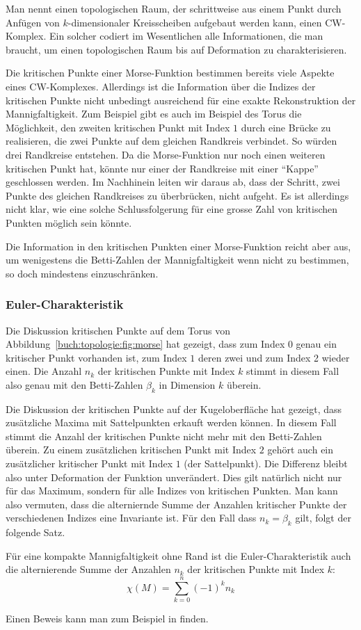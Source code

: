 Man nennt einen topologischen Raum, der schrittweise aus einem Punkt
durch Anfügen von $k$-dimensionaler Kreisscheiben aufgebaut werden kann,
einen CW-Komplex.
%
Ein solcher codiert im Wesentlichen alle Informationen, die man braucht,
um einen topologischen Raum bis auf Deformation zu charakterisieren.

Die kritischen Punkte einer Morse-Funktion bestimmen bereits viele
Aspekte eines CW-Komplexes.
Allerdings ist die Information über die Indizes der kritischen Punkte
nicht unbedingt ausreichend für eine exakte Rekonstruktion der
Mannigfaltigkeit.
Zum Beispiel gibt es auch im Beispiel des Torus die Möglichkeit,
den zweiten kritischen Punkt mit Index $1$ durch eine Brücke zu
realisieren, die zwei Punkte auf dem gleichen Randkreis verbindet.
So würden drei Randkreise entstehen.
Da die Morse-Funktion nur noch einen weiteren kritischen Punkt hat,
könnte nur einer der Randkreise mit einer ``Kappe'' geschlossen
werden.
Im Nachhinein leiten wir daraus ab, dass der Schritt, zwei Punkte des
gleichen Randkreises zu überbrücken, nicht aufgeht.
Es ist allerdings nicht klar, wie eine solche Schlussfolgerung
für eine grosse Zahl von kritischen Punkten möglich sein könnte.

Die Information in den kritischen Punkten einer Morse-Funktion reicht
aber aus, um wenigestens die Betti-Zahlen der Mannigfaltigkeit
wenn nicht zu bestimmen, so doch mindestens einzuschränken.

%
%
\subsubsection{Euler-Charakteristik}
Die Diskussion kritischen Punkte auf dem Torus von
Abbildung~\ref{buch:topologie:fig:morse} hat gezeigt,
dass zum Index $0$ genau ein kritischer Punkt vorhanden ist,
zum Index $1$ deren zwei und zum Index 2 wieder einen.
Die Anzahl $n_k$ der kritischen Punkte mit Index $k$ stimmt in diesem Fall
also genau mit den Betti-Zahlen $\beta_k$ in Dimension $k$ überein.

Die Diskussion der kritischen Punkte auf der Kugeloberfläche
hat gezeigt, dass zusätzliche Maxima mit Sattelpunkten erkauft werden
können.
In diesem Fall stimmt die Anzahl der kritischen Punkte nicht mehr
mit den Betti-Zahlen überein.
Zu einem zusätzlichen kritischen Punkt mit Index $2$ gehört auch
ein zusätzlicher kritischer Punkt mit Index $1$ (der Sattelpunkt).
Die Differenz bleibt also unter Deformation der Funktion unverändert.
Dies gilt natürlich nicht nur für das Maximum, sondern für alle Indizes
von kritischen Punkten.
Man kann also vermuten, dass die alterniernde Summe der Anzahlen
kritischer Punkte der verschiedenen Indizes eine Invariante ist.
Für den Fall dass $n_k=\beta_k$ gilt, folgt der folgende Satz.

\begin{satz}
Für eine kompakte Mannigfaltigkeit ohne Rand ist die Euler-Charakteristik
auch die alternierende Summe der Anzahlen $n_k$ der kritischen Punkte 
mit Index $k$:
\[
\chi(M)
=
\sum_{k=0}^n (-1)^k n_k
\]
\end{satz}

Einen Beweis kann man zum Beispiel in \cite{buch:hirsch} finden.

